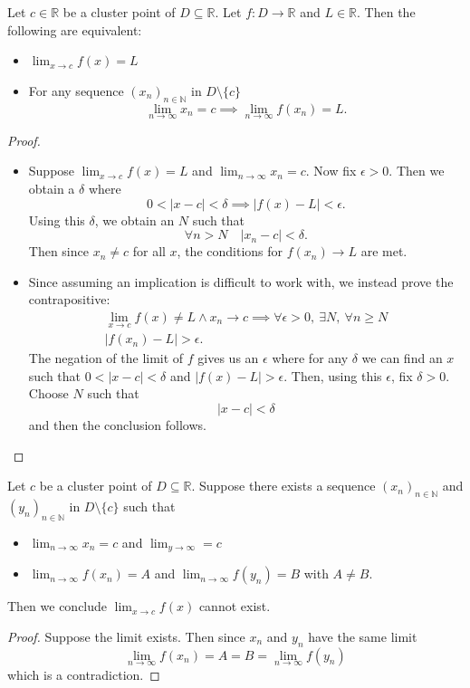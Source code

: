 \begin{theorem}
  Let $c \in \mathbb{R}$ be a cluster point of $D \subseteq \mathbb{R}$. Let $f: D \rightarrow \mathbb{R}$ and $L \in \mathbb{R}$. Then the following are equivalent:
  \begin{itemize}
    \item $\lim_{x \rightarrow c} f(x) = L$
    \item For any sequence $(x_n)_{n \in \mathbb{N}}$ in $D \setminus \{c\}$ 
      \[\lim_{n \rightarrow \infty} x_n = c \implies \lim_{n\rightarrow \infty} f(x_n) = L.\]
  \end{itemize}
\end{theorem}
\begin{proof}
    \begin{itemize}
      \item Suppose $\lim_{x \rightarrow c} f(x) = L$ and $\lim_{n \rightarrow \infty} x_n = c$. Now fix $\epsilon > 0$. Then we obtain a $\delta$ where
        \[0 < |x - c| < \delta \implies |f(x) - L| < \epsilon.\]
        Using this $\delta$, we obtain an $N$ such that
        \[\forall n > N \quad |x_n - c| < \delta.\]
        Then since $x_n \not = c$ for all $x$, the conditions for $f(x_n) \rightarrow L$ are met.
      \item Since assuming an implication is difficult to work with, we instead prove the contrapositive: 
        \begin{align*}
        \lim_{x \rightarrow c} f(x) \not = L \wedge x_n \rightarrow c \implies \forall \epsilon > 0, \  \exists N, \ \forall n \geq N \\
        |f(x_n) - L| > \epsilon
        .\end{align*}
        The negation of the limit of $f$ gives us an $\epsilon$ where for any $\delta$ we can find an $x$ such that $0 < |x - c| < \delta$ and $| f(x) - L| > \epsilon$. Then, using this $\epsilon$, fix $\delta >0$. Choose $N$ such that
        \[| x - c| < \delta\]
        and then the conclusion follows.
    \end{itemize}
\end{proof}

\begin{prop}
  Let $c$ be a cluster point of $D \subseteq \mathbb{R}$. Suppose there exists a sequence $(x_n)_{n\in \mathbb{N}}$ and $(y_n)_{n \in \mathbb{N}}$ in $D \setminus \{c\}$ such that
  \begin{itemize}
    \item $\lim_{n \rightarrow \infty} x_n = c$ and $\lim_{y \rightarrow \infty} = c$
    \item $\lim_{n\rightarrow \infty} f(x_n) = A$ and $\lim_{n \rightarrow \infty} f(y_n)= B$ with $A \not = B$.
  \end{itemize}

  Then we conclude $\lim_{x \rightarrow c} f(x)$ cannot exist.
\end{prop}
\begin{proof}
  Suppose the limit exists. Then since $x_n$ and $y_n$ have the same limit
  \[\lim_{n \rightarrow \infty} f(x_n) = A = B = \lim_{n \rightarrow \infty} f(y_n)\]
  which is a contradiction.
\end{proof}

